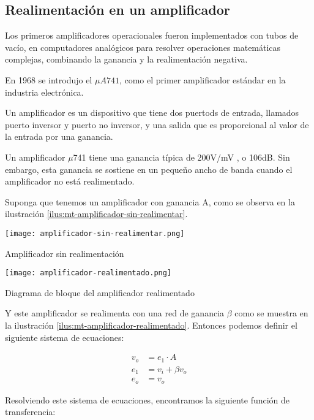 \subsection{Realimentación en un amplificador}
Los primeros amplificadores operacionales fueron implementados con tubos de vacío, en computadores analógicos para resolver operaciones matemáticas complejas, combinando la ganancia y la realimentación negativa.

En 1968 se introdujo el $\mu A741$, como el primer amplificador estándar en la industria electrónica.

Un amplificador es un dispositivo que tiene dos puertods de entrada, llamados puerto inversor y puerto no inversor, y una salida que es proporcional
al valor de la entrada por una ganancia.

Un amplificador $\mu$741 tiene una ganancia típica de 200V/mV , o 106dB. Sin embargo, esta ganancia se sostiene en un pequeño ancho de banda cuando el amplificador no está realimentado.

Suponga que tenemos un amplificador con ganancia A, como se observa
en la ilustración \ref{ilus:mt-amplificador-sin-realimentar}.

\begin{ilustracion}[ht]
    \centering
    \texttt{[image: amplificador-sin-realimentar.png]}
    \caption{Amplificador sin realimentación}
    \label{ilus:mt-amplificador-sin-realimentar}
\end{ilustracion}

\begin{ilustracion}[ht]
    \centering
    \texttt{[image: amplificador-realimentado.png]}
    \caption{Diagrama de bloque del amplificador realimentado}
    \label{ilus:mt-amplificador-realimentado}
\end{ilustracion}

Y este amplificador se realimenta con una red de ganancia $\beta$ como se muestra en la ilustración \ref{ilus:mt-amplificador-realimentado}. Entonces podemos definir el siguiente sistema de ecuaciones:

\begin{align*}
    v_o & = e_1 \cdot A \\
    e_1 & = v_i + \beta v_o \\
    e_o & = v_o
\end{align*}

Resolviendo este sistema de ecuaciones, encontramos la siguiente función de transferencia:

